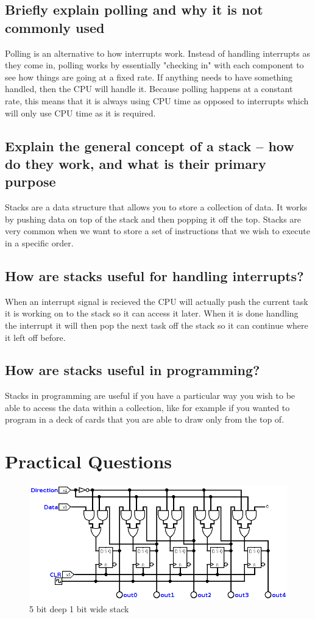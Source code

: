 \documentclass[11pt]{scrartcl}
\begin{document}
\subsection*{Briefly explain polling and why it is not commonly used}
Polling is an alternative to how interrupts work. Instead of handling interrupts as
they come in, polling works by essentially "checking in" with each component to see
how things are going at a fixed rate. If anything needs to have something handled, then
the CPU will handle it. Because polling happens at a constant rate, this means that it is
always using CPU time as opposed to interrupts which will only use CPU time as it is
required.

\subsection*{Explain the general concept of a stack -- how do they work, and what is
             their primary purpose}
Stacks are a data structure that allows you to store a collection of data. It works by
pushing data on top of the stack and then popping it off the top. Stacks are very common
when we want to store a set of instructions that we wish to execute in a specific order.

\subsection*{How are stacks useful for handling interrupts?}
When an interrupt signal is recieved the CPU will actually push the current task it is working
on to the stack so it can access it later. When it is done handling the interrupt it will then
pop the next task off the stack so it can continue where it left off before.

\subsection*{How are stacks useful in programming?}
Stacks in programming are useful if you have a particular way you wish to be able to access the
data within a collection, like for example if you wanted to program in a deck of cards that you
are able to draw only from the top of.

\section*{Practical Questions}

\begin{figure}[h]
    \includegraphics[scale=0.5]{images/stack.png}
    \caption{5 bit deep 1 bit wide stack}
\end{figure}
\end{document}
